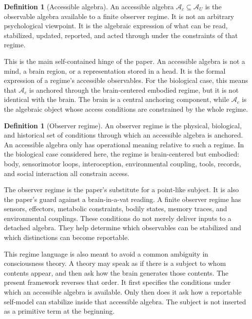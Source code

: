 \documentclass[12pt]{article}
\theoremstyle{definition}
\newtheorem{definition}[proposition]{Definition}
\theoremstyle{remark}
\newcommand{\AU}{\mathcal A_U}
\newcommand{\Ac}{\mathcal A_c}
\begin{document}
\begin{definition}[Accessible algebra]
An accessible algebra \(\Ac\subseteq\AU\) is the observable algebra
available to a finite observer regime. It is not an arbitrary
psychological viewpoint. It is the algebraic expression of what can be
read, stabilized, updated, reported, and acted through under the
constraints of that regime.
\end{definition}

This is the main self-contained hinge of the paper. An accessible
algebra is not a mind, a brain region, or a representation stored in a
head. It is the formal expression of a regime's accessible observables.
For the biological case, this means that \(\Ac\) is anchored through the
brain-centered embodied regime, but it is not identical with the brain.
The brain is a central anchoring component, while \(\Ac\) is the
algebraic object whose access conditions are constrained by the whole
regime.

\begin{definition}[Observer regime]
An observer regime is the physical, biological, and historical set of
conditions through which an accessible algebra is anchored. An
accessible algebra only has operational meaning relative to such a
regime. In the biological case considered here, the regime is
brain-centered but embodied: body, sensorimotor loops, interoception,
environmental coupling, tools, records, and social interaction all
constrain access.
\end{definition}

The observer regime is the paper's substitute for a point-like subject.
It is also the paper's guard against a brain-in-a-vat reading. A finite
observer regime has sensors, effectors, metabolic constraints, bodily
states, memory traces, and environmental couplings. These conditions do
not merely deliver inputs to a detached algebra. They help determine
which observables can be stabilized and which distinctions can become
reportable.

This regime language is also meant to avoid a common ambiguity in
consciousness theory. A theory may speak as if there is a subject to
whom contents appear, and then ask how the brain generates those
contents. The present framework reverses that order. It first specifies
the conditions under which an accessible algebra is available. Only
then does it ask how a reportable self-model can stabilize inside that
accessible algebra. The subject is not inserted as a primitive term at
the beginning.
\end{document}
